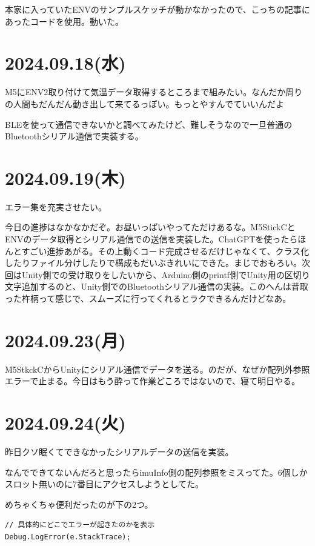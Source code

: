 \documentclass[fleqn,twocolumn]{mynote}
\begin{document}
本家に入っていたENVのサンプルスケッチが動かなかったので、こっちの記事にあったコードを使用。動いた。

\section*{2024.09.18(水)}
M5にENV2取り付けて気温データ取得するところまで組みたい。なんだか周りの人間もだんだん動き出して来てるっぽい。もっとやすんでていいんだよ

BLEを使って通信できないかと調べてみたけど、難しそうなので一旦普通のBluetoothシリアル通信で実装する。

\section*{2024.09.19(木)}
エラー集を充実させたい。

今日の進捗はなかなかだぞ。お昼いっぱいやってただけあるな。M5StickCとENVのデータ取得とシリアル通信での送信を実装した。ChatGPTを使ったらほんとすごい進捗あがる。その上動くコード完成させるだけじゃなくて、クラス化したりファイル分けしたりで構成もだいぶきれいにできた。まじでおもろい。次回はUnity側での受け取りをしたいから、Arduino側のprintf側でUnity用の区切り文字追加するのと、Unity側でのBluetoothシリアル通信の実装。このへんは昔取った杵柄って感じで、スムーズに行ってくれるとラクできるんだけどなあ。

\section*{2024.09.23(月)}
M5StkckCからUnityにシリアル通信でデータを送る。のだが、なぜか配列外参照エラーで止まる。今日はもう酔って作業どころではないので、寝て明日やる。

\section*{2024.09.24(火)}
昨日クソ眠くてできなかったシリアルデータの送信を実装。

なんでできてないんだろと思ったらimuInfo側の配列参照をミスってた。6個しかスロット無いのに7番目にアクセスしようとしてた。

めちゃくちゃ便利だったのが下の2つ。

\begin{lstlisting}[caption=Unityのエラー表示,label=code:error-output]
// 具体的にどこでエラーが起きたのかを表示
Debug.LogError(e.StackTrace);
\end{lstlisting}
\end{document}
